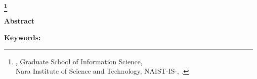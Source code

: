 \begin{center}
 \renewcommand{\thefootnote}{\fnsymbol{footnote}}
 \Large\bfseries \etitle\footnote[1]
 {{\edoctitle}, Graduate School of Information \mbox{Science,}\\
 Nara Institute of Science and Technology,
 {NAIST-IS-\studentnumber}, \edate.}
 \renewcommand{\thefootnote}{\arabic{footnote}}
\end{center}
\vspace*{1truemm}
\begin{center}
 \large\eauthor
\end{center}
\vspace*{10truemm}
\begin{center}
 {\bfseries Abstract}
\end{center}
\vspace*{2truemm}
\par
\eabstract
\vspace*{5truemm}
\begin{flushleft}
 {\bfseries Keywords:}
\end{flushleft}\ekeywords
